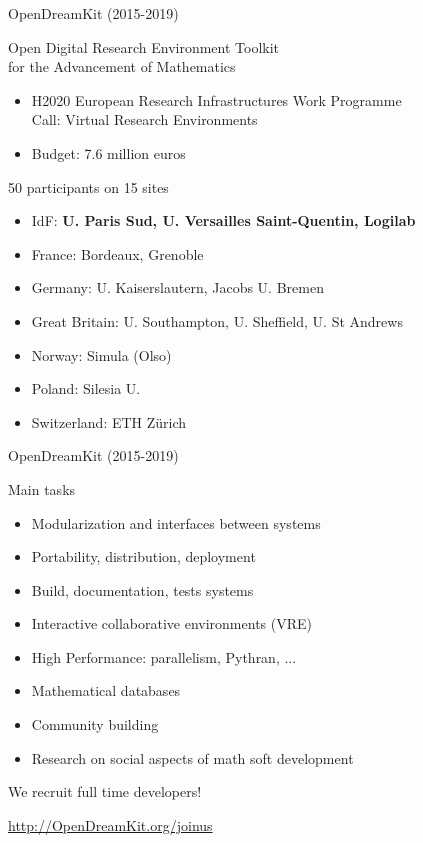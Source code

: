 \documentclass[
  usenames,svgnames, %
  compress,
  ]{beamer}
\begin{document}
\begin{frame}{OpenDreamKit (2015-2019)}

  \begin{block}{Open Digital Research Environment Toolkit\\
    for the Advancement of Mathematics}
    \begin{itemize}
    \item H2020 European Research Infrastructures Work
      Programme\\
 Call: Virtual Research Environments
    \item Budget: 7.6 million euros
    \end{itemize}
  \end{block}

\begin{block}{50 participants on 15 sites}
    \begin{itemize}
    \item IdF: \textbf{U. Paris Sud, U. Versailles Saint-Quentin, Logilab}
    \item France: Bordeaux, Grenoble
    \item Germany: U. Kaiserslautern, Jacobs U. Bremen
    \item Great Britain: U. Southampton, U. Sheffield, U. St Andrews
    \item Norway: Simula (Olso)
    \item Poland: Silesia U.
    \item Switzerland: ETH Zürich
    \end{itemize}
  \end{block}
\end{frame}

\begin{frame}{OpenDreamKit (2015-2019)}
  \begin{block}{Main tasks}
    \begin{itemize}
    \item Modularization and interfaces between systems
    \item Portability, distribution, deployment
    \item Build, documentation, tests systems
    \item Interactive collaborative environments (VRE)
    \item High Performance: parallelism, Pythran, ...
    \item Mathematical databases
    \item Community building
    \item Research on social aspects of math soft development
    \end{itemize}
  \end{block}
  \bigskip

  \begin{block}{\Large \color{red} We recruit full time developers!}
    \centerline{\LARGE \url{http://OpenDreamKit.org/joinus}}
  \end{block}

\end{frame}
\end{document}
